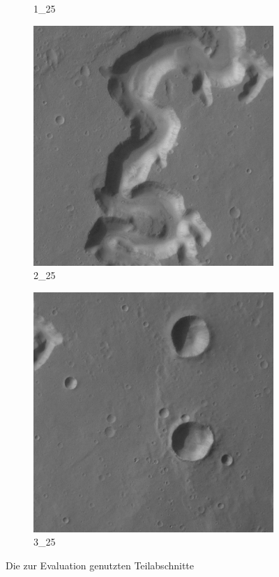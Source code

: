 \begin{figure}[H]
\begin{subfigure}{0.3\textwidth}
		\caption{1\_25}
	\end{subfigure}
	\begin{subfigure}{0.3\textwidth}
		\centering
		\includegraphics[width=\textwidth,keepaspectratio]{images/h0905_0000/2_25.jpg}
		\caption{2\_25}
	\end{subfigure}
	\begin{subfigure}{0.3\textwidth}
		\centering
		\includegraphics[width=\textwidth,keepaspectratio]{images/h0905_0000/3_25.jpg}
		\caption{3\_25}
	\end{subfigure}
	\caption{Die zur Evaluation genutzten Teilabschnitte}
	\label{fig:h0905_0000}
\end{figure}

